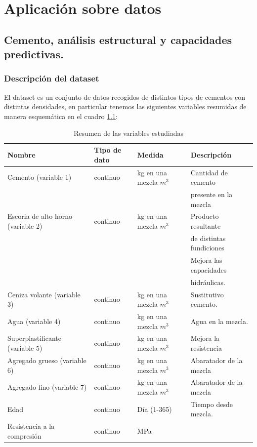 \chapter{Aplicación sobre datos}

\section{Cemento, análisis estructural y capacidades predictivas.}
\subsection*{Descripción del dataset}
\noindent El dataset  \cite{Yeh 2007} es un conjunto de datos recogidos de distintos tipos de cementos con distintas densidades, en particular tenemos las siguientes variables resumidas de manera esquemática en el cuadro \ref{tab:Resumen Variables}:
\begin{table}[h]
\footnotesize
\centering
\begin{tabular}{|l|l|l|l|}
\hline
Nombre & Tipo de dato & Medida & Descripción \\
\hline
Cemento (variable 1) & continuo & kg en una mezcla $m^3$  &  Cantidad de cemento \\&&&presente en la mezcla \\
Escoria de alto horno (variable 2) & continuo & kg en una mezcla $m^3$ & Producto resultante \\&&&de distintas fundiciones\\&&& Mejora las capacidades \\&&& hidráulicas. \\
Ceniza volante (variable 3) & continuo & kg en una mezcla $m^3$ & Sustitutivo cemento.\\
Agua (variable 4) & continuo & kg en una mezcla $m^3$ & Agua en la mezcla.\\
Superplastificante (variable 5) & continuo & kg en una mezcla $m^3$ & Mejora la resistencia\\
Agregado grueso (variable 6) & continuo & kg en una mezcla $m^3$ &  Abaratador de la mezcla\\
Agregado fino (variable 7) & continuo & kg en una mezcla $m^3$ & Abaratador de la mezcla \\
Edad & continuo & Día (1-365) & Tiempo desde mezcla. \\
Resistencia a la compresión & continuo & MPa & \\
\hline
\end{tabular}
\caption{Resumen de las variables estudiadas}
\label{tab:Resumen Variables}
\end{table}




